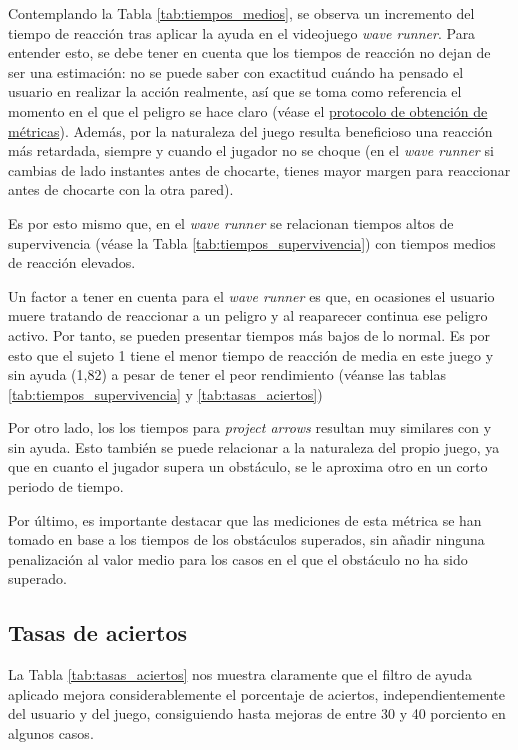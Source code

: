 Contemplando la Tabla \ref{tab:tiempos_medios}, se observa un incremento del
tiempo de reacción tras aplicar la ayuda en el videojuego \textit{wave runner}.
Para entender esto, se debe tener en cuenta que los tiempos de reacción no
dejan de ser una estimación: no se puede saber con exactitud cuándo ha pensado
el usuario en realizar la acción realmente, así que se toma como referencia el
momento en el que el peligro se hace claro (véase el
\hyperref[subsec:protocoloObtencionMetricas]{protocolo de obtención de
      métricas}). Además, por la naturaleza del juego resulta beneficioso una
reacción más retardada, siempre y cuando el jugador no se choque (en el
\textit{wave runner} si cambias de lado instantes antes de chocarte, tienes
mayor margen para reaccionar antes de chocarte con la otra pared).

Es por esto mismo que, en el \textit{wave runner} se relacionan tiempos altos
de supervivencia (véase la Tabla \ref{tab:tiempos_supervivencia}) con tiempos
medios de reacción elevados.

Un factor a tener en cuenta para el \textit{wave runner} es que, en ocasiones
el usuario muere tratando de reaccionar a un peligro y al reaparecer continua
ese peligro activo. Por tanto, se pueden presentar tiempos más bajos de lo
normal. Es por esto que el sujeto 1 tiene el menor tiempo de reacción de media
en este juego y sin ayuda (1,82) a pesar de tener el peor rendimiento (véanse
las tablas \ref{tab:tiempos_supervivencia} y \ref{tab:tasas_aciertos})

Por otro lado, los los tiempos para \textit{project arrows} resultan muy
similares con y sin ayuda. Esto también se puede relacionar a la naturaleza del
propio juego, ya que en cuanto el jugador supera un obstáculo, se le aproxima
otro en un corto periodo de tiempo.

Por último, es importante destacar que las mediciones de esta métrica se han
tomado en base a los tiempos de los obstáculos superados, sin añadir ninguna
penalización al valor medio para los casos en el que el obstáculo no ha sido
superado.

\subsection{Tasas de aciertos}
\label{subsec:rt_analisis_tasas_aciertos}

La Tabla \ref{tab:tasas_aciertos} nos muestra claramente que el filtro de ayuda
aplicado mejora considerablemente el porcentaje de aciertos, independientemente
del usuario y del juego, consiguiendo hasta mejoras de entre 30 y 40 porciento
en algunos casos.

